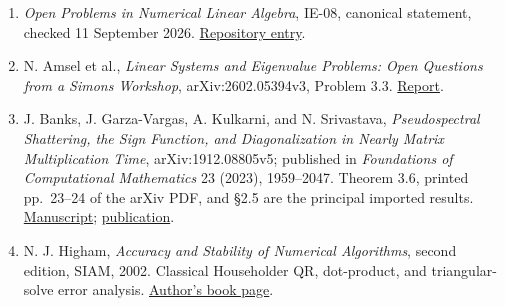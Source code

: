 \documentclass[10pt,a4paper]{article}
\providecommand{\tightlist}{\setlength{\itemsep}{0pt}\setlength{\parskip}{0pt}}
\begin{document}
\begin{enumerate}
\def\labelenumi{\arabic{enumi}.}
\tightlist
\item
  \emph{Open Problems in Numerical Linear Algebra}, IE-08, canonical
  statement, checked 11 September 2026.
  \href{https://github.com/ajt60gaibb/OpenProblemsInNLA/blob/main/eigenvalues-and-inverse-problems/IE-08/README.md}{Repository
  entry}.
\item
  N. Amsel et al., \emph{Linear Systems and Eigenvalue Problems: Open
  Questions from a Simons Workshop}, arXiv:2602.05394v3, Problem 3.3.
  \href{https://arxiv.org/html/2602.05394v3}{Report}.
\item
  J. Banks, J. Garza-Vargas, A. Kulkarni, and N. Srivastava,
  \emph{Pseudospectral Shattering, the Sign Function, and
  Diagonalization in Nearly Matrix Multiplication Time},
  arXiv:1912.08805v5; published in \emph{Foundations of Computational
  Mathematics} 23 (2023), 1959--2047. Theorem 3.6, printed pp.~23--24 of
  the arXiv PDF, and §2.5 are the principal imported results.
  \href{https://arxiv.org/pdf/1912.08805}{Manuscript};
  \href{https://doi.org/10.1007/s10208-022-09577-5}{publication}.
\item
  N. J. Higham, \emph{Accuracy and Stability of Numerical Algorithms},
  second edition, SIAM, 2002. Classical Householder QR, dot-product, and
  triangular-solve error analysis.
  \href{https://nhigham.com/accuracy-and-stability-of-numerical-algorithms/}{Author's
  book page}.
\end{enumerate}
\end{document}
